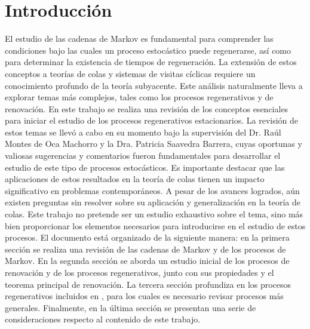 \documentclass{article}
\numberwithin{equation}{section}
\begin{document}

\section*{Introducción}
El estudio de las cadenas de Markov es fundamental para comprender las condiciones bajo las cuales un proceso estocástico puede regenerarse, así como para determinar la existencia de tiempos de regeneración. La extensión de estos conceptos a teorías de colas y sistemas de visitas cíclicas requiere un conocimiento profundo de la teoría subyacente. Este análisis naturalmente lleva a explorar temas más complejos, tales como los procesos regenerativos y de renovación. En este trabajo se realiza una revisión de los conceptos esenciales para iniciar el estudio de los procesos regenerativos estacionarios. La revisión de estos temas se llevó a cabo en su momento bajo la supervisión del Dr. Raúl Montes de Oca Machorro y la Dra. Patricia Saavedra Barrera, cuyas oportunas y valiosas sugerencias y comentarios fueron fundamentales para desarrollar el estudio de este tipo de procesos estocásticos. Es importante destacar que las aplicaciones de estos resultados en la teoría de colas tienen un impacto significativo en problemas contemporáneos. A pesar de los avances logrados, aún existen preguntas sin resolver sobre su aplicación y generalización en la teoría de colas. Este trabajo no pretende ser un estudio exhaustivo sobre el tema, sino más bien proporcionar los elementos necesarios para introducirse en el estudio de estos procesos. El documento está organizado de la siguiente manera: en la primera sección se realiza una revisión de las cadenas de Markov y de los procesos de Markov. En la segunda sección se aborda un estudio inicial de los procesos de renovación y de los procesos regenerativos, junto con sus propiedades y el teorema principal de renovación. La tercera sección profundiza en los procesos regenerativos incluidos en \cite{Thorisson}, para los cuales es necesario revisar procesos más generales. Finalmente, en la última sección se presentan una serie de consideraciones respecto al contenido de este trabajo.
\end{document}
